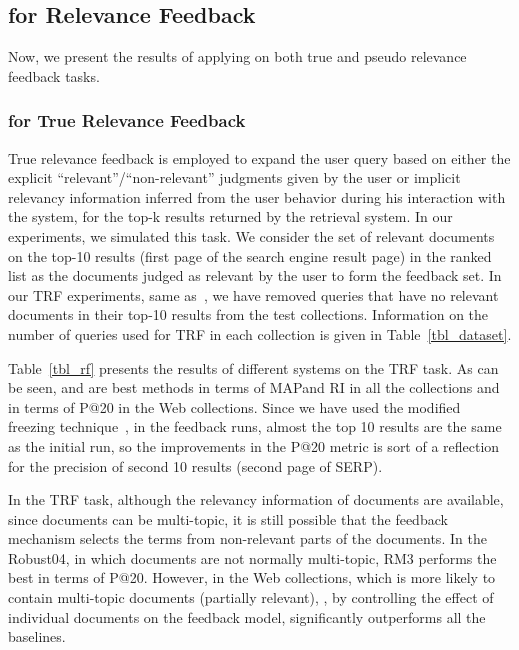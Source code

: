 \subsection{\acswlm for Relevance Feedback}
Now, we present the results of applying \acswlm on both true and pseudo relevance feedback tasks.

\subsubsection{\acswlm for True Relevance Feedback}
\label{sec:RF}

True relevance feedback is employed to expand the user query based on either the explicit ``relevant''/``non-relevant'' judgments given by the user or implicit relevancy information inferred from the user behavior during his interaction with the system, for the top-k results returned by the retrieval system. 
In our experiments, we simulated this task. We consider the set of relevant documents on the top-10 results (first page of the search engine result page) in the ranked list as the documents judged as relevant by the user to form the feedback set. In our TRF experiments, same as~\citet{Lv:2009:CIKM}, we have removed queries that have no relevant documents in their top-10 results from the test collections. Information on the number of queries used for TRF in each collection is given in Table~\ref{tbl_dataset}.

Table~\ref{tbl_rf} presents the results of different systems on the TRF task. As can be seen, \acswlm and \acrswlm are best methods in terms of MAP\@ and RI in all the collections and in terms of P@20 in the Web collections. 
Since we have used the modified freezing technique~\cite{cirillo:1969,Ruthven:2003}, in the feedback runs, almost the top 10 results are the same as the initial run, so the improvements in the P@20 metric is sort of a reflection for the precision of second 10 results (second page of SERP). 

In the TRF task, although the relevancy information of documents are available,  since documents can be multi-topic, it is still possible that the feedback mechanism selects the terms from non-relevant parts of the documents. In the Robust04, in which documents are not normally multi-topic, RM3 performs the best in terms of P@20. However, in the Web collections, which is more likely to contain multi-topic documents (partially relevant), \acswlm, by controlling the effect of individual documents on the feedback model, significantly outperforms all the baselines.

